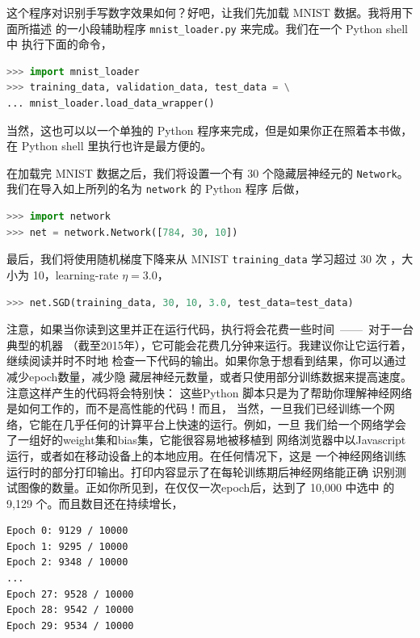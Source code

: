 

这个程序对识别手写数字效果如何？好吧，让我们先加载 MNIST 数据。我将用下面所描述
的一小段辅助程序 \lstinline!mnist_loader.py! 来完成。我们在一个 Python shell 中
执行下面的命令，

\begin{lstlisting}[language=Python]
>>> import mnist_loader
>>> training_data, validation_data, test_data = \
... mnist_loader.load_data_wrapper()
\end{lstlisting}

当然，这也可以以一个单独的 Python 程序来完成，但是如果你正在照着本书做，在
Python shell 里执行也许是最方便的。

在加载完 MNIST 数据之后，我们将设置一个有 30 个隐藏层神经元的
\lstinline!Network!。我们在导入如上所列的名为 \lstinline!network! 的 Python 程序
后做，

\begin{lstlisting}[language=Python]
>>> import network
>>> net = network.Network([784, 30, 10])
\end{lstlisting}

最后，我们将使用随机梯度下降来从 MNIST \lstinline!training_data! 学习超过 30 次%
\epochs{}，\minibatch{}大小为 10，\gls*{learning-rate} $\eta = 3.0$，

\begin{lstlisting}[language=Python]
>>> net.SGD(training_data, 30, 10, 3.0, test_data=test_data)
\end{lstlisting}

注意，如果当你读到这里并正在运行代码，执行将会花费一些时间~——~对于一台典型的机器
（截至2015年），它可能会花费几分钟来运行。我建议你让它运行着，继续阅读并时不时地
检查一下代码的输出。如果你急于想看到结果，你可以通过减少\gls*{epoch}数量，减少隐
藏层神经元数量，或者只使用部分训练数据来提高速度。注意这样产生的代码将会特别快：
这些Python 脚本只是为了帮助你理解神经网络是如何工作的，而不是高性能的代码！而且，
当然，一旦我们已经训练一个网络，它能在几乎任何的计算平台上快速的运行。例如，一旦
我们给一个网络学会了一组好的\gls*{weight}集和\gls*{bias}集，它能很容易地被移植到
网络浏览器中以Javascript 运行，或者如在移动设备上的本地应用。在任何情况下，这是
一个神经网络训练运行时的部分打印输出。打印内容显示了在每轮训练期后神经网络能正确
识别测试图像的数量。正如你所见到，在仅仅一次\gls*{epoch}后，达到了 10,000 中选中
的 9,129 个。而且数目还在持续增长，

\begin{lstlisting}[language=sh]
Epoch 0: 9129 / 10000
Epoch 1: 9295 / 10000
Epoch 2: 9348 / 10000
...
Epoch 27: 9528 / 10000
Epoch 28: 9542 / 10000
Epoch 29: 9534 / 10000
\end{lstlisting}

